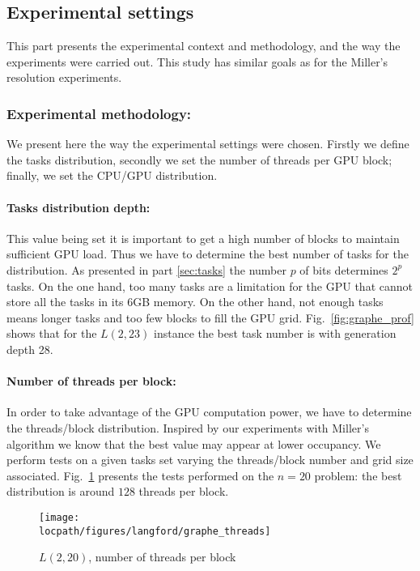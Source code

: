 \subsection{Experimental settings}
This part presents the experimental context and methodology, and the way the experiments were carried out.
This study has similar goals as for the Miller's resolution experiments.

\subsubsection{Experimental methodology: }
We present here the way the experimental settings were chosen.
Firstly we define the tasks distribution, secondly we set the number of threads per GPU block; finally, we set the CPU/GPU distribution.


\paragraph{Tasks distribution depth: }
This value being set it is important to get a high number of blocks to maintain sufficient GPU load.
Thus we have to determine the best number of tasks for the distribution. As presented in part \ref{sec:tasks} the number $p$ of bits determines $2^p$ tasks. On the one hand, too many tasks are a limitation for the GPU that cannot store all the tasks in its 6GB memory. On the other hand, not enough tasks means longer tasks and too few blocks to fill the GPU grid. Fig.~\ref{fig:graphe_prof} shows that for the $L(2,23)$ instance the best task number is with generation depth 28.


\paragraph{Number of threads per block: }
In order to take advantage of the GPU computation power, we have to determine the threads/block distribution. Inspired by our experiments with Miller's algorithm we know that the best value may appear at lower occupancy. We perform tests on a given tasks set varying the threads/block number and grid size associated. 
Fig.~\ref{fig:graphe_threads} presents the tests performed on the $n=20$ problem: the best distribution is around $128$ threads per block. 
\begin{figure}[htbp]
\centering 
\texttt{[image: \\locpath/figures/langford/graphe\_threads]}
\caption{$L(2,20)$, number of threads per block}
\label{fig:graphe_threads}
\end{figure}

